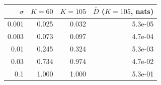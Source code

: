 \begin{tabular}{rrrr}
\toprule
$\sigma$ & $K=60$ & $K=105$ & $\bar D$ ($K{=}105$, nats)\\
\midrule
0.001 & 0.025 & 0.032 & 5.3e-05\\
0.003 & 0.073 & 0.097 & 4.7e-04\\
0.01 & 0.245 & 0.324 & 5.3e-03\\
0.03 & 0.734 & 0.974 & 4.7e-02\\
0.1 & 1.000 & 1.000 & 5.3e-01\\
\bottomrule
\end{tabular}
